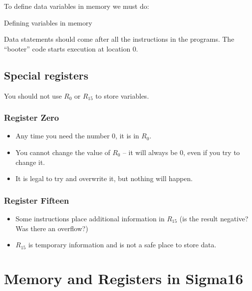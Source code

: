 To define data variables in memory we must do:
\begin{highlight}{Defining variables in memory}
\end{highlight}
Data statements should come after all the instructions in the programs.
The ``booter'' code starts execution at location \(0\).

\subsection{Special registers}\label{sub:special_registers}

You should not use \(R_0\) or \(R_{15}\) to store variables.

\subsubsection{Register Zero}\label{ssub:register_zero}

\begin{itemize}
    \item Any time you need the number \(0\), it is in \(R_0\).
    \item You cannot change the value of \(R_0\) -- it will always  be \(0\), even if you try to change it.
    \item It is legal to try and overwrite it, but nothing will happen.
\end{itemize}

\subsubsection{Register Fifteen}\label{ssub:register_fifteen}

\begin{itemize}
    \item Some instructions place additional information in \(R_{15}\) (is the result negative? Was there an overflow?)
    \item \(R_{15}\) is temporary information and is not a safe place to store data.
\end{itemize}

\section{Memory and Registers in Sigma16}\label{sec:memory_and_registers_in_sigma16}

